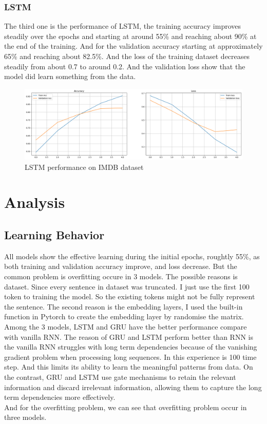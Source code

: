 \documentclass[12pt,a4paper]{article}
\begin{document}
\subsubsection{LSTM}
The third one is the performance of LSTM, the training accuracy improves steadily over the epochs and starting at around 55\% and reaching about 90\% at the end of the training. And for the validation accuracy starting at approximately 65\% and reaching about 82.5\%. And the loss of the training dataset decreases steadily from about 0.7 to around 0.2. And the validation loss show that the model did learn something from the data. 
\begin{figure}[h!]
    \centering
    \includegraphics[width=1\textwidth]{../Pic/lstm_performance.png}
    \caption{LSTM performance on IMDB dataset}
\end{figure}

\newpage
\section{Analysis}
\subsection{Learning Behavior}
All models show the effective learning during the initial epochs, roughtly 55\%, as both training and validation accuracy improve, and loss decrease. But the common problem is overfitting occure in 3 models. The possible reasons is dataset. Since every sentence in dataset was truncated. I just use the first 100 token to training the model. So the existing tokens might not be fully represent the sentence. The second reason is the embedding layers, I used the built-in function in Pytorch to create the embedding layer by randomise the matrix. 
\\[1ex]
Among the 3 models, LSTM and GRU have the better performance compare with vanilla RNN. The reason of GRU and LSTM perform better than RNN is the vanilla RNN struggles with long term dependencies because of the vanishing gradient problem when processing long sequences. In this experience is 100 time step. And this limits its ability to learn the meaningful patterns from data. On the contrast, GRU and LSTM use gate mechanisms to retain the relevant information and discard irrelevant information, allowing them to capture the long term dependencies more effectively.
\\[1ex]
And for the overfitting problem, we can see that overfitting problem occur in three models. 

\newpage







\printbibliography
\end{document}
